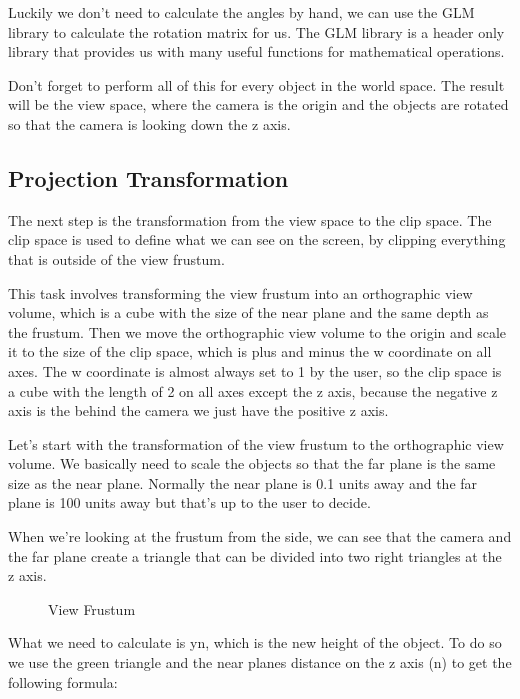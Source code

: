 \documentclass[12pt]{report} \usepackage{preamble}
\begin{document}
Luckily we don't need to calculate the angles by hand, we can use the
GLM library to calculate the rotation matrix for us. The GLM library is a
header only library that provides us with many useful functions for
mathematical operations.

Don't forget to perform all of this for every object in the world space.
The result will be the view space, where the camera is the origin and
the objects are rotated so that the camera is looking down the z axis.

\subsection{Projection Transformation}

The next step is the transformation from the view space to the clip
space. The clip space is used to define what we can see
on the screen, by clipping everything that is outside of the view frustum.

This task involves transforming the view frustum into an orthographic view
volume, which is a cube with the size of the near plane and the same depth
as the frustum. Then we move the orthographic view volume to the origin
and scale it to the size of the clip space, which is plus and minus the
w coordinate on all axes. The w coordinate is almost always set to 1 by the user,
so the clip space is a cube with the length of 2 on all axes except the z axis,
because the negative z axis is the behind the camera we just have the positive
z axis.

Let's start with the transformation of the view frustum to the orthographic
view volume. We basically need to scale the objects so that the far plane is
the same size as the near plane. Normally the near plane is 0.1 units away and the far
plane is 100 units away but that's up to the user to decide.

When we're looking at the frustum from the side, we can see that the camera and
the far plane create a triangle that can be divided into two right triangles at the
z axis.

\begin{figure}[hbtp]
	\centering 
	\caption{View Frustum}
\end{figure} \FloatBarrier

What we need to calculate is yn, which is the new height of the object.
To do so we use the green triangle and the near planes distance on the z axis
(n) to get the following formula:
\end{document}
